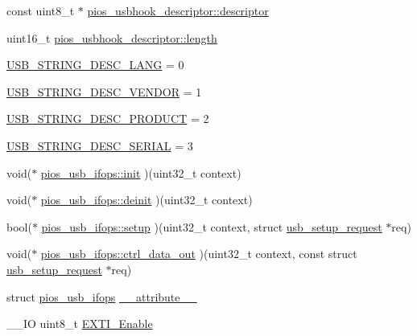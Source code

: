 \begin{DoxyCompactItemize}
\item 
const uint8\-\_\-t $\ast$ \hyperlink{group___p_i_o_s___u_s_b_h_o_o_k_ga56ff6e20a77e4421c8c47442ca13d75b}{pios\-\_\-usbhook\-\_\-descriptor\-::descriptor}
\item 
uint16\-\_\-t \hyperlink{group___p_i_o_s___u_s_b_h_o_o_k_ga9cc49b35b49236ac74e747d179a3650f}{pios\-\_\-usbhook\-\_\-descriptor\-::length}
\item 
\hyperlink{group___p_i_o_s___u_s_b_h_o_o_k_gac5f1f2d3bae1b6b5b9912f0fdd72dc93}{\-U\-S\-B\-\_\-\-S\-T\-R\-I\-N\-G\-\_\-\-D\-E\-S\-C\-\_\-\-L\-A\-N\-G} = 0
\item 
\hyperlink{group___p_i_o_s___u_s_b_h_o_o_k_ga05f051e48c96e9d6d2e05804c8023fe2}{\-U\-S\-B\-\_\-\-S\-T\-R\-I\-N\-G\-\_\-\-D\-E\-S\-C\-\_\-\-V\-E\-N\-D\-O\-R} = 1
\item 
\hyperlink{group___p_i_o_s___u_s_b_h_o_o_k_ga80dce006aa14f2a9412e8ee68b4627b0}{\-U\-S\-B\-\_\-\-S\-T\-R\-I\-N\-G\-\_\-\-D\-E\-S\-C\-\_\-\-P\-R\-O\-D\-U\-C\-T} = 2
\item 
\hyperlink{group___p_i_o_s___u_s_b_h_o_o_k_ga1c1263ee96f36ccbfc0e662b85e044bf}{\-U\-S\-B\-\_\-\-S\-T\-R\-I\-N\-G\-\_\-\-D\-E\-S\-C\-\_\-\-S\-E\-R\-I\-A\-L} = 3
\item 
void($\ast$ \hyperlink{group___p_i_o_s___u_s_b_h_o_o_k_ga08614658e728cfb81cb4091e3e210624}{pios\-\_\-usb\-\_\-ifops\-::init} )(uint32\-\_\-t context)
\item 
void($\ast$ \hyperlink{group___p_i_o_s___u_s_b_h_o_o_k_ga23c8bc133e24838b490c81a9d47318d4}{pios\-\_\-usb\-\_\-ifops\-::deinit} )(uint32\-\_\-t context)
\item 
bool($\ast$ \hyperlink{group___p_i_o_s___u_s_b_h_o_o_k_gafc58e776c6ff79a3974ca6dc1decf467}{pios\-\_\-usb\-\_\-ifops\-::setup} )(uint32\-\_\-t context, struct \hyperlink{structusb__setup__request}{usb\-\_\-setup\-\_\-request} $\ast$req)
\item 
void($\ast$ \hyperlink{group___p_i_o_s___u_s_b_h_o_o_k_ga7fce932d233ec743f190170b5b277746}{pios\-\_\-usb\-\_\-ifops\-::ctrl\-\_\-data\-\_\-out} )(uint32\-\_\-t context, const struct \hyperlink{structusb__setup__request}{usb\-\_\-setup\-\_\-request} $\ast$req)
\item 
struct \hyperlink{structpios__usb__ifops}{pios\-\_\-usb\-\_\-ifops} \hyperlink{group___p_i_o_s___u_s_b_h_o_o_k_gaefc540229d1ad4829fb317812135c7b4}{\-\_\-\-\_\-attribute\-\_\-\-\_\-}
\item 
\-\_\-\-\_\-\-I\-O uint8\-\_\-t \hyperlink{group___p_i_o_s___u_s_b_h_o_o_k_ga80e4a20c4f7576283232cda440c47694}{\-E\-X\-T\-I\-\_\-\-Enable}

\end{DoxyCompactItemize}
